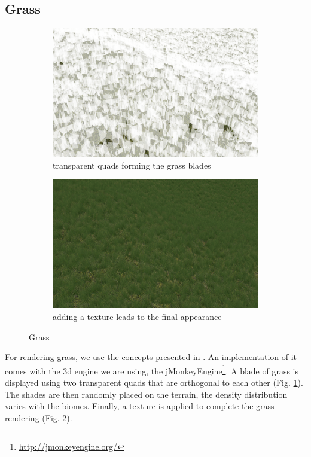 \documentclass[journal, letterpaper]{IEEEtran}
\begin{document}
\subsection{Grass}
\begin{figure}
	\centering
	\begin{subfigure}[b]{0.45\textwidth}
		\includegraphics[width=\textwidth]{images/Grass2}
		\caption{transparent quads forming the grass blades}
		\label{fig:grass1}
	\end{subfigure}
	\begin{subfigure}[b]{0.45\textwidth}
		\includegraphics[width=\textwidth]{images/Grass1}
		\caption{adding a texture leads to the final appearance}
		\label{fig:grass2}
	\end{subfigure}
	\caption{Grass}\label{fig:grass}
\end{figure}
For rendering grass, we use the concepts presented in \cite{KurtPelzer.}. An implementation of it comes with the 3d engine we are using, the jMonkeyEngine\footnote{\url{http://jmonkeyengine.org/}}.
A blade of grass is displayed using two transparent quads that are orthogonal to each other (Fig. \ref{fig:grass1}). The shades are then randomly placed on the terrain, the density distribution varies with the biomes. Finally, a texture is applied to complete the grass rendering (Fig. \ref{fig:grass2}).
\end{document}
